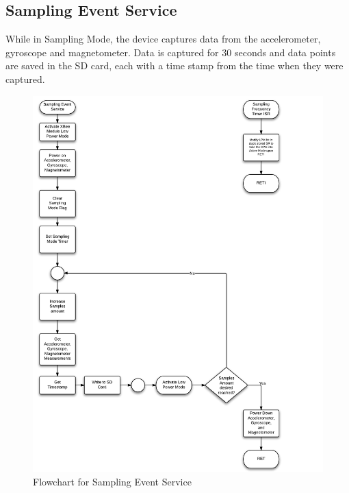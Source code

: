 \subsection{Sampling Event Service}
While in Sampling Mode, the device captures data from the accelerometer, gyroscope and magnetometer. Data is captured for 30 seconds and data points are saved in the SD card, each with a time stamp from the time when they were captured.
\begin{figure}[H]
	\centering
	\includegraphics[scale=0.7]{img/SamplingEventService}
	\caption{Flowchart for Sampling Event Service \label{fig:samplingMode}}
\end{figure}


